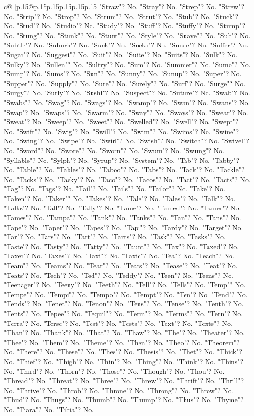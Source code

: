 \documentclass{article}
\begin{document}
{\begin{supertabular}{c@{$\;$}|p{.15\linewidth}@{}p{.15\linewidth}p{.15\linewidth}p{.15\linewidth}p{.15\linewidth}p{.15\linewidth}}
{{{"Straw"? No. "Stray"? No. "Strep"? No. "Strew"? No. "Strip"? No. "Strop"? No. "Strum"? No. "Strut"? No. "Stub"? No. "Stuck"? No. "Stud"? No. "Studio"? No. "Study"? No. "Stuff"? No. "Stuffy"? No. "Stump"? No. "Stung"? No. "Stunk"? No. "Stunt"? No. "Style"? No. "Suave"? No. "Sub"? No. "Subtle"? No. "Suburb"? No. "Suck"? No. "Sucks"? No. "Suede"? No. "Suffer"? No. "Sugar"? No. "Suggest"? No. "Suit"? No. "Suite"? No. "Suits"? No. "Sulk"? No. "Sulky"? No. "Sullen"? No. "Sultry"? No. "Sum"? No. "Summer"? No. "Sumo"? No. "Sump"? No. "Sums"? No. "Sun"? No. "Sunny"? No. "Sunup"? No. "Super"? No. "Supper"? No. "Supply"? No. "Sure"? No. "Surely"? No. "Surf"? No. "Surge"? No. "Surgy"? No. "Surly"? No. "Sushi"? No. "Suspect"? No. "Suture"? No. "Swab"? No. "Swabs"? No. "Swag"? No. "Swags"? No. "Swamp"? No. "Swan"? No. "Swans"? No. "Swap"? No. "Swaps"? No. "Swarm"? No. "Sway"? No. "Sways"? No. "Swear"? No. "Sweat"? No. "Sweep"? No. "Sweet"? No. "Swelled"? No. "Swell"? No. "Swept"? No. "Swift"? No. "Swig"? No. "Swill"? No. "Swim"? No. "Swims"? No. "Swine"? No. "Swing"? No. "Swipe"? No. "Swirl"? No. "Swish"? No. "Switch"? No. "Swivel"? No. "Sword"? No. "Swore"? No. "Sworn"? No. "Swum"? No. "Swung"? No. "Syllable"? No. "Sylph"? No. "Syrup"? No. "System"? No. "Tab"? No. "Tabby"? No. "Table"? No. "Tables"? No. "Taboo"? No. "Tabs"? No. "Tack"? No. "Tackle"? No. "Tacks"? No. "Tacky"? No. "Taco"? No. "Tacos"? No. "Tact"? No. "Tacts"? No. "Tag"? No. "Tags"? No. "Tail"? No. "Tails"? No. "Tailor"? No. "Take"? No. "Taken"? No. "Taker"? No. "Takes"? No. "Tale"? No. "Tales"? No. "Talk"? No. "Talks"? No. "Tall"? No. "Tally"? No. "Tame"? No. "Tamed"? No. "Tamer"? No. "Tames"? No. "Tampa"? No. "Tank"? No. "Tanks"? No. "Tan"? No. "Tans"? No. "Tape"? No. "Taper"? No. "Tapes"? No. "Tapi"? No. "Tardy"? No. "Target"? No. "Tar"? No. "Tars"? No. "Tart"? No. "Tarts"? No. "Task"? No. "Tasks"? No. "Taste"? No. "Tasty"? No. "Tatty"? No. "Taunt"? No. "Tax"? No. "Taxed"? No. "Taxer"? No. "Taxes"? No. "Taxi"? No. "Taxic"? No. "Tea"? No. "Teach"? No. "Team"? No. "Teams"? No. "Tear"? No. "Tears"? No. "Tease"? No. "Teat"? No. "Teats"? No. "Tech"? No. "Ted"? No. "Teddy"? No. "Teen"? No. "Teens"? No. "Teenager"? No. "Teeny"? No. "Teeth"? No. "Tell"? No. "Tells"? No. "Temp"? No. "Tempe"? No. "Tempi"? No. "Tempo"? No. "Tempt"? No. "Ten"? No. "Tend"? No. "Tends"? No. "Tenet"? No. "Tenon"? No. "Tens"? No. "Tense"? No. "Tenth"? No. "Tents"? No. "Tepee"? No. "Tequil"? No. "Term"? No. "Terms"? No. "Tern"? No. "Terra"? No. "Terse"? No. "Test"? No. "Tests"? No. "Text"? No. "Texts"? No. "Than"? No. "Thank"? No. "That"? No. "Thaw"? No. "The"? No. "Theater"? No. "Thee"? No. "Them"? No. "Theme"? No. "Then"? No. "Theo"? No. "Theorem"? No. "There"? No. "These"? No. "Thes"? No. "Thesis"? No. "Thet"? No. "Thick"? No. "Thief"? No. "Thigh"? No. "Thin"? No. "Thing"? No. "Think"? No. "Thins"? No. "Third"? No. "Thorn"? No. "Those"? No. "Though"? No. "Thou"? No. "Thread"? No. "Threat"? No. "Three"? No. "Threw"? No. "Thrift"? No. "Thrill"? No. "Thrive"? No. "Throb"? No. "Throne"? No. "Throng"? No. "Throw"? No. "Thud"? No. "Thugs"? No. "Thumb"? No. "Thump"? No. "Thus"? No. "Thyme"? No. "Tiara"? No. "Tibia"? No. }}}
\end{supertabular}}
\end{document}
